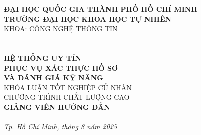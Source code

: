 
\begin{titlepage}
  \begin{center}

    {\large \textbf{ĐẠI HỌC QUỐC GIA THÀNH PHỐ HỒ CHÍ MINH}} \\
    \smallskip
    {\large \textbf{TRƯỜNG ĐẠI HỌC KHOA HỌC TỰ NHIÊN}} \\
    \medskip
    KHOA: CÔNG NGHỆ THÔNG TIN \\[1.8cm]

    {\Large \bfseries \studentone} \\
    {\Large \bfseries \studenttwo} \\[2cm]

    {\huge \bfseries HỆ THỐNG UY TÍN \\ PHỤC VỤ XÁC THỰC HỒ SƠ \\[3mm] VÀ ĐÁNH GIÁ KỸ NĂNG} \\[2cm]

    {\large KHÓA LUẬN TỐT NGHIỆP CỬ NHÂN} \\
    {\large CHƯƠNG TRÌNH CHẤT LƯỢNG CAO} \\[2cm]

    {\Large \textbf{GIẢNG VIÊN HƯỚNG DẪN}} \\
    \medskip
    {\large \instructor} \\

    \vfill
    \textit{Tp. Hồ Chí Minh, tháng 8 năm 2025}
  \end{center}
\end{titlepage}

\restoregeometry